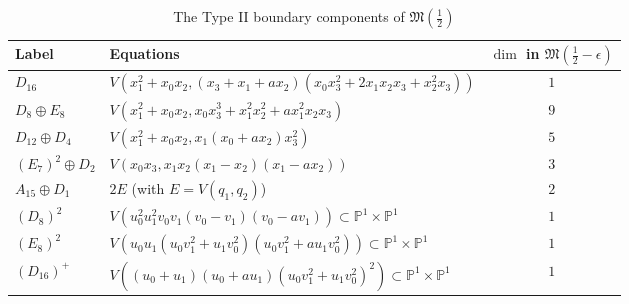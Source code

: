 \documentclass[11pt]{amsart}
\numberwithin{equation}{section}
\theoremstyle{plain}
\theoremstyle{remark}
\theoremstyle{definition}
\newcommand{\bP}{\mathbb{P}}
\newcommand{\gM}{\mathfrak{M}}
\begin{document}
\begin{table}[htb!]
\renewcommand{\arraystretch}{1.50}
 \begin{tabular}{l|l|c}
 Label&Equations&$\dim$ in $\gM(\frac{1}{2}-\epsilon)$\\
 \hline
 \hline
$D_{16}$& $V\left(x_1^2+x_0x_2,(x_3+x_1+ax_2)(x_0x_3^2+2x_1x_2x_3+x_2^2x_3)\right)$&$1$\\
 \hline
$D_8\oplus E_8$&$V\left(x_1^2+x_0x_2, x_0x_3^3+x_1^2x_2^2+a x_1^2x_2x_3\right)$&$9$\\
 $D_{12}\oplus D_4$&$V\left(x_1^2+x_0x_2,x_1(x_0+ax_2)x_3^2\right)$&$5$\\
$(E_7)^2\oplus D_2$& $V\left(x_0x_3,x_1x_2(x_1-x_2)(x_1-ax_2)\right)$&$3$\\
$A_{15}\oplus D_1$&$2E$ (with $E=V(q_1,q_2)$)& $2$\\
$(D_8)^2$&$V(u_0^2u_1^2v_0v_1(v_0-v_1)(v_0-av_1))\subset\bP^1\times \bP^1$& $1$\\
  \hdashline
$(E_8)^2$&$V\left(u_0u_1(u_0v_1^2+u_1v_0^2)(u_0v_1^2+a u_1v_0^2)\right)\subset\bP^1\times \bP^1$&$1$\\
$(D_{16})^+$&$V\left((u_0+u_1)(u_0+a u_1)(u_0v_1^2+u_1v_0^2)^2\right)\subset\bP^1\times \bP^1
$&$1$\\
\hline
 \end{tabular}
 \vspace{0.2cm}
\caption{The Type II boundary components of $\gM(\frac{1}{2})$}\label{tabletype2git}
 \end{table}
\end{document}
